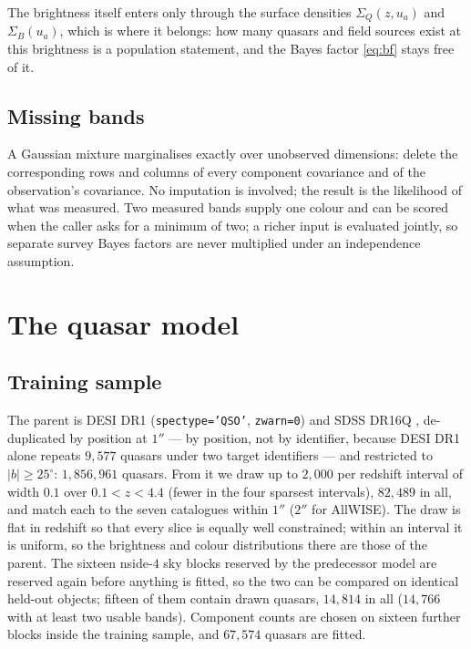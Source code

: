 \documentclass[11pt,a4paper]{article}
\newcommand{\Sq}{\Sigma_{Q}}
\newcommand{\Sb}{\Sigma_{B}}
\begin{document}
The brightness itself enters only through the surface densities
$\Sq(z,u_a)$ and $\Sb(u_a)$, which is where it belongs: how many quasars and
field sources exist at this brightness is a population statement, and the
Bayes factor \eqref{eq:bf} stays free of it.

\subsection{Missing bands}

A Gaussian mixture marginalises exactly over unobserved dimensions: delete the
corresponding rows and columns of every component covariance and of the
observation's covariance. No imputation is involved; the result is the
likelihood of what was measured. Two measured bands supply one colour and can
be scored when the caller asks for a minimum of two; a richer input is evaluated
jointly, so separate survey Bayes factors are never multiplied under an
independence assumption.

\section{The quasar model}
\label{sec:qso}

\subsection{Training sample}
\label{sec:qso-sample}

The parent is DESI DR1 (\texttt{spectype='QSO'}, \texttt{zwarn=0}) and SDSS
DR16Q \citep{lyke2020dr16q}, de-duplicated by position at $1''$ --- by
position, not by identifier, because DESI DR1 alone repeats $9{,}577$ quasars
under two target identifiers --- and restricted to $|b|\ge25^\circ$:
$1{,}856{,}961$ quasars. From it we draw up to $2{,}000$ per redshift interval of
width $0.1$ over $0.1<z<4.4$ (fewer in the four sparsest intervals), $82{,}489$
in all, and match each to the seven catalogues within $1''$ ($2''$ for AllWISE).
The draw is flat in redshift so that every slice is equally well constrained;
within an interval it is uniform, so the brightness and colour distributions
there are those of the parent. The sixteen nside-$4$ sky blocks reserved by the
predecessor model are reserved again before anything is fitted, so the two can
be compared on identical held-out objects; fifteen of them contain drawn quasars,
$14{,}814$ in all ($14{,}766$ with at least two usable bands). Component counts
are chosen on sixteen further blocks inside the training sample, and $67{,}574$
quasars are fitted.
\end{document}
